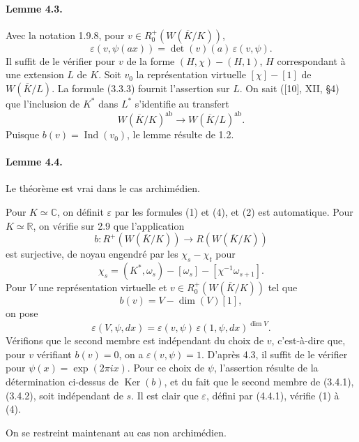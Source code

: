 \documentclass[10pt]{article}
\newcommand{\C}{\mathbb C}
\newcommand{\Ind}{\operatorname{Ind}}
\providecommand{\Ker}{\operatorname{Ker}}
\providecommand{\ab}{\mathrm{ab}}
\providecommand{\R}{\mathbb R}
\providecommand{\ab}{\mathrm{ab}}
\providecommand{\ab}{\mathrm{ab}}
\providecommand{\Ind}{\operatorname{Ind}}
\providecommand{\Ker}{\operatorname{Ker}}
\begin{document}
\paragraph{Lemme 4.3.} Avec la notation 1.9.8, pour \(v\in R^+_0(W(\overline K/K))\),
\[
\varepsilon(v,\psi(ax))=\det(v)(a)\,\varepsilon(v,\psi).
\]
Il suffit de le vérifier pour \(v\) de la forme \((H,\chi)-(H,1)\), \(H\) correspondant à une extension \(L\) de \(K\). Soit \(v_0\) la représentation virtuelle \([\chi]-[1]\) de \(W(\overline K/L)\). La formule (3.3.3) fournit l'assertion sur \(L\). On sait ([10], XII, §4) que l'inclusion de \(K^*\) dans \(L^*\) s'identifie au transfert
\[
W(\overline K/K)^{\ab}\longrightarrow W(\overline K/L)^{\ab}.
\]
Puisque \(b(v)=\Ind(v_0)\), le lemme résulte de 1.2.

\paragraph{Lemme 4.4.} Le théorème est vrai dans le cas archimédien.

Pour \(K\simeq\C\), on définit \(\varepsilon\) par les formules (1) et (4), et (2) est automatique. Pour \(K\simeq\R\), on vérifie sur 2.9 que l'application
\[
b:R^+(W(\overline K/K))\longrightarrow R(W(\overline K/K))
\]
est surjective, de noyau engendré par les \(\chi_s-\chi_t\) pour
\[
\chi_s=(K^*,\omega_s)-[\omega_s]-[\chi^{-1}\omega_{s+1}].
\]
Pour \(V\) une représentation virtuelle et \(v\in R^+_0(W(\overline K/K))\) tel que
\[
b(v)=V-\dim(V)[1],
\]
on pose
\[
\tag{4.4.1}
\varepsilon(V,\psi,dx)=\varepsilon(v,\psi)\,\varepsilon(1,\psi,dx)^{\dim V}.
\]
Vérifions que le second membre est indépendant du choix de \(v\), c'est-à-dire que, pour \(v\) vérifiant \(b(v)=0\), on a \(\varepsilon(v,\psi)=1\). D'après 4.3, il suffit de le vérifier pour \(\psi(x)=\exp(2\pi ix)\). Pour ce choix de \(\psi\), l'assertion résulte de la détermination ci-dessus de \(\Ker(b)\), et du fait que le second membre de (3.4.1), (3.4.2), soit indépendant de \(s\). Il est clair que \(\varepsilon\), défini par (4.4.1), vérifie (1) à (4).

On se restreint maintenant au cas non archimédien.


\newpage
\end{document}
